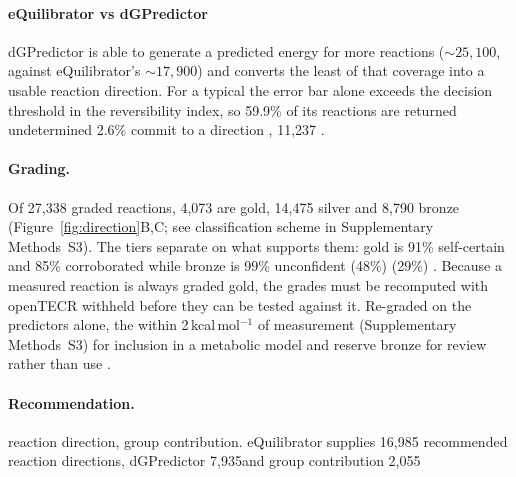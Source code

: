 \documentclass[unnumsec,webpdf,modern,large]{oup-authoring-template}
\providecommand{\DIFadd}[1]{{\protect\color{red}{#1}}} %
\providecommand{\DIFaddbegin}{} %
\providecommand{\DIFaddend}{} %
\begin{document}
\paragraph{eQuilibrator vs dGPredictor} dGPredictor is able to generate a predicted energy for more reactions ($\sim25,100$, against eQuilibrator's $\sim17,900$) and converts the least of that coverage into a usable reaction direction.
For a typical  \DIFaddbegin \DIFadd{reaction, }\DIFaddend the error bar \DIFaddbegin \DIFadd{from dGPredictor }\DIFaddend alone exceeds the decision threshold in the reversibility index, so 59.9\% of its reactions are returned undetermined  \DIFaddbegin \DIFadd{versus }\DIFaddend 2.6\%  \DIFaddbegin \DIFadd{from eQuilibrator.
These sources agree 94.8\% when they }\DIFaddend commit to a direction ,  \DIFaddbegin \DIFadd{although eQuilibrator provides more unique predictions (}\DIFaddend 11,237 \DIFaddbegin \DIFadd{) than dGPredictor provides (3,877) because dGPredictor often abstains rather than contradicting}\DIFaddend .

\paragraph{Grading.} Of 27,338 graded reactions, 4,073 are gold, 14,475 silver and 8,790 bronze (Figure~\ref{fig:direction}B,C; see classification scheme in Supplementary Methods~S3).
The tiers separate on what supports them: gold is 91\% self-certain and 85\% corroborated  while bronze is 99\% unconfident \DIFaddbegin \DIFadd{, either uncorroborated }\DIFaddend (48\%)  \DIFaddbegin \DIFadd{or contradicted }\DIFaddend (29\%) \DIFaddbegin \DIFadd{by other sources}\DIFaddend .
Because a measured reaction is always graded gold, the grades must be recomputed with openTECR withheld before they can be tested against it.
Re-graded on the predictors alone, the  \DIFaddbegin \DIFadd{363 distinct anchored reactions split into 172 gold, 186 silver and 5 bronze.
The gold and silver reactions fall }\DIFaddend within 2\,kcal\,mol$^{-1}$ of measurement  \DIFaddbegin \DIFadd{93.0\% and 89.2\% of the time }\DIFaddend (Supplementary Methods~S3) \DIFaddbegin \DIFadd{, hence we recommend these tiers }\DIFaddend for inclusion in a metabolic model  and reserve bronze for review rather than use \DIFaddbegin \DIFadd{in models}\DIFaddend .

\paragraph{Recommendation.}  \DIFaddbegin \DIFadd{We recommend the consensus among sources, but when sources disagree on }\DIFaddend reaction direction,  \DIFaddbegin \DIFadd{we prioritize eQuilibrator followed by dGPredictor and then }\DIFaddend group contribution.
\DIFaddbegin \DIFadd{Following this tiered approach, }\DIFaddend eQuilibrator supplies 16,985 recommended reaction directions, dGPredictor \DIFaddbegin \DIFadd{provides }\DIFaddend 7,935\DIFaddbegin \DIFadd{, }\DIFaddend and group contribution \DIFaddbegin \DIFadd{provides }\DIFaddend 2,055 \DIFaddbegin \DIFadd{, the source for each recommendation being recorded.
}\DIFaddend 
\end{document}
